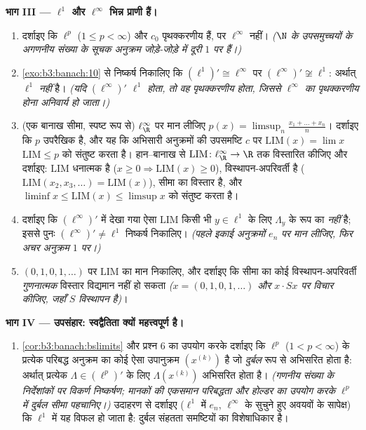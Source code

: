 \begin{problem}[{सप्ताहांत समस्या --- $(\ell^p)' = \ell^q$, स्वद्वैतिता, और
$\ell^\infty$ की विचित्रता}]
\medskip
\noindent\textbf{भाग III --- $\ell^1$ और $\ell^\infty$ भिन्न प्राणी हैं।}
\begin{enumerate}[resume]
  \item दर्शाइए कि $\ell^p$ ($1 \leq p < \infty$) और $c_0$ पृथक्करणीय हैं, पर
        $\ell^\infty$ नहीं। \emph{($\N$ के उपसमुच्चयों के अगणनीय संख्या
        के सूचक अनुक्रम जोड़े-जोड़े में दूरी $1$ पर हैं।)}
  \item \cref{exo:b3:banach:10} से निष्कर्ष निकालिए कि $(\ell^1)'
        \cong \ell^\infty$ पर $(\ell^\infty)' \not\cong
        \ell^1$: अर्थात्
        $\ell^1$  \emph{नहीं} है। \emph{(यदि $(\ell^\infty)'$ $\ell^1$
        होता, तो वह पृथक्करणीय होता, जिससे $\ell^\infty$ का पृथक्करणीय
        होना अनिवार्य हो जाता।)}
  \item (एक बानाख सीमा, स्पष्ट रूप से) $\ell^\infty_\R$ पर मान लीजिए $p(x) = \limsup_n \frac{x_1 + \dots + x_n}{n}$।
        दर्शाइए कि $p$ उपरैखिक है, और यह कि अभिसारी अनुक्रमों
        की उपसमष्टि $c$ पर $\mathrm{LIM}(x) = \lim x$ $\mathrm{LIM} \leq p$ को संतुष्ट करता है।
        हान--बानाख से $\mathrm{LIM} \colon \ell^\infty_\R \to \R$ तक विस्तारित कीजिए और दर्शाइए:
        $\mathrm{LIM}$ धनात्मक है ($x \geq 0 \Rightarrow
        \mathrm{LIM}(x) \geq 0$), विस्थापन-अपरिवर्ती है
        ($\mathrm{LIM}(x_2, x_3, \dots) = \mathrm{LIM}(x)$), सीमा का विस्तार है, और $\liminf x \leq
        \mathrm{LIM}(x)\leq \limsup x$ को संतुष्ट करता है।
  \item दर्शाइए कि $(\ell^\infty)'$ में देखा गया ऐसा $\mathrm{LIM}$ किसी भी $y \in \ell^1$ के
        लिए $\Lambda_y$ के रूप का \emph{नहीं} है; इससे पुनः $(\ell^\infty)'
        \neq \ell^1$
        निष्कर्ष निकालिए। \emph{(पहले इकाई अनुक्रमों $e_n$ पर मान
        लीजिए, फिर अचर अनुक्रम $1$ पर।)}
  \item $(0,1,0,1,\dots)$ पर $\mathrm{LIM}$ का मान निकालिए, और दर्शाइए कि सीमा का कोई
        विस्थापन-अपरिवर्ती \emph{गुणनात्मक} विस्तार विद्यमान नहीं
        हो सकता \emph{($x =
        (0,1,0,1,\dots)$ और $x\cdot Sx$ पर विचार कीजिए, जहाँ $S$
        विस्थापन है)}।
\end{enumerate}

\medskip
\noindent\textbf{भाग IV --- उपसंहार: स्वद्वैतिता क्यों
महत्त्वपूर्ण है।}
\begin{enumerate}[resume]
  \item \cref{cor:b3:banach:bslimits} और प्रश्न 6 का उपयोग करके दर्शाइए कि $\ell^p$ ($1 < p <
        \infty$)
        के प्रत्येक परिबद्ध अनुक्रम का कोई ऐसा उपानुक्रम $(x^{(k)})$ है
        जो \emph{दुर्बल} रूप से अभिसरित होता है: अर्थात् प्रत्येक
        $\Lambda \in (\ell^p)'$ के लिए $\Lambda(x^{(k)})$ अभिसरित होता है। \emph{(गणनीय संख्या
        के निर्देशांकों पर विकर्ण निष्कर्षण; मानकों की एकसमान
        परिबद्धता और होल्डर का उपयोग करके $\ell^p$ में दुर्बल सीमा
        पहचानिए।)} उदाहरण से दर्शाइए ($\ell^1$ में $e_n$, $\ell^\infty$ के
        सुचुने हुए अवयवों के सापेक्ष) कि $\ell^1$ में यह विफल हो
        जाता है: दुर्बल संहतता  समष्टियों का विशेषाधिकार
        है।
\end{enumerate}


\end{problem}
